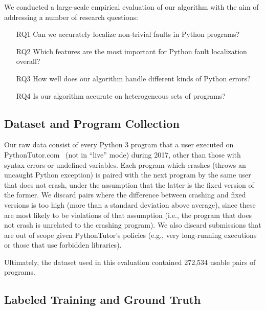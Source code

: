 \documentclass[conference]{IEEEtran}
\begin{document}
We conducted a large-scale empirical evaluation of our algorithm with the
aim of addressing a number of research questions:
\begin{enumerate}

\item[RQ1]{Can we accurately localize non-trivial faults in Python
programs?}

\item[RQ2]{Which features are the most important for Python fault
localization overall?}


\item[RQ3]{How well does our algorithm handle different kinds of Python errors?}

\item[RQ4]{Is our algorithm accurate on heterogeneous sets of programs?}

\end{enumerate}

\subsection{Dataset and Program Collection}

Our raw data consist of every Python 3 program that a user executed on
PythonTutor.com~\cite{Guo2013-vu} (not in ``live'' mode) during 2017, other
than those with syntax errors or undefined variables.  Each program which
crashes (throws an uncaught Python exception) is paired with the next
program by the same user that does not crash, under the assumption that
the latter is the fixed version of the former. We discard pairs where the
difference between crashing and fixed versions is too high (more than a
standard deviation above average), since these are most likely to be violations of that
assumption (i.e., the program that does not crash is unrelated to the
crashing program). We also discard submissions that are out of scope given
PythonTutor's policies (e.g., very long-running executions or those that
use forbidden libraries).

Ultimately, the dataset used in this evaluation contained
272,534 usable pairs of programs.

\subsection{Labeled Training and Ground Truth}
\label{sec-training}
\end{document}
